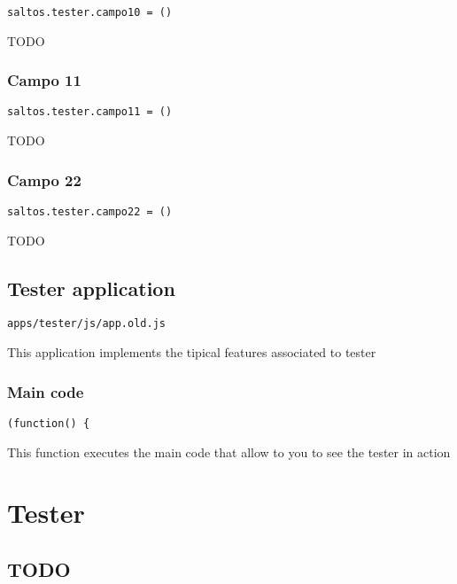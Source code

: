 \documentclass[a4paper]{book}
\begin{document}
\begin{lstlisting}
saltos.tester.campo10 = ()
\end{lstlisting}

TODO

\hypertarget{toc98}{}
\subsection{Campo 11}

\begin{lstlisting}
saltos.tester.campo11 = ()
\end{lstlisting}

TODO

\hypertarget{toc99}{}
\subsection{Campo 22}

\begin{lstlisting}
saltos.tester.campo22 = ()
\end{lstlisting}

TODO

\hypertarget{toc100}{}
\section{Tester application}

\begin{lstlisting}
apps/tester/js/app.old.js
\end{lstlisting}

This application implements the tipical features associated to tester

\hypertarget{toc101}{}
\subsection{Main code}

\begin{lstlisting}
(function() {
\end{lstlisting}

This function executes the main code that allow to you to see the tester in action


\hypertarget{toc102}{}
\chapter{Tester}

\hypertarget{toc103}{}
\section{TODO}
\end{document}
